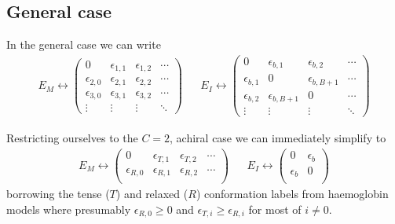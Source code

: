 \documentclass[11pt]{article}
\begin{document}
\subsection{General case}
In the general case we can write
\begin{align}
	E_M \leftrightarrow \begin{pmatrix}
		                    0              & \epsilon_{1,1} & \epsilon_{1,2} & \cdots \\
		                    \epsilon_{2,0} & \epsilon_{2,1} & \epsilon_{2,2} & \cdots \\
		                    \epsilon_{3,0} & \epsilon_{3,1} & \epsilon_{3,2} & \cdots \\
		                    \vdots         & \vdots         & \vdots         & \ddots
	                    \end{pmatrix}
	 &  &
	E_I \leftrightarrow \begin{pmatrix}
		                    0              & \epsilon_{b,1}   & \epsilon_{b,2}   & \cdots \\
		                    \epsilon_{b,1} & 0                & \epsilon_{b,B+1} & \cdots \\
		                    \epsilon_{b,2} & \epsilon_{b,B+1} & 0                & \cdots \\
		                    \vdots         & \vdots           & \vdots           & \ddots
	                    \end{pmatrix}
\end{align}

Restricting ourselves to the $C=2$, achiral case we can immediately simplify to
\begin{align}
	E_M \leftrightarrow \begin{pmatrix}
		                    0              & \epsilon_{T,1} & \epsilon_{T,2} & \cdots \\
		                    \epsilon_{R,0} & \epsilon_{R,1} & \epsilon_{R,2} & \cdots \\
	                    \end{pmatrix}
	 &  &
	E_I \leftrightarrow \begin{pmatrix}
		                    0          & \epsilon_b \\
		                    \epsilon_b & 0          \\
	                    \end{pmatrix}
\end{align}
borrowing the tense ($T$) and relaxed ($R$) conformation labels from haemoglobin models where presumably $\epsilon_{R,0} \geq 0$ and $\epsilon_{T,i} \geq \epsilon_{R,i}$ for most of $i \neq 0$.
\end{document}
